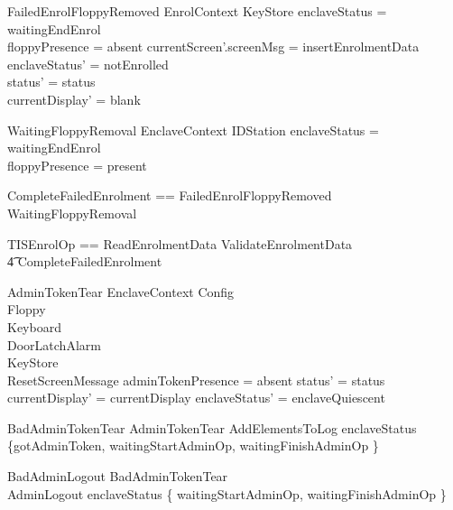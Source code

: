 \begin{schema}{FailedEnrolFloppyRemoved}
        EnrolContext
\also
        \Xi KeyStore
\where
        enclaveStatus = waitingEndEnrol
\\      floppyPresence = absent
\also
        currentScreen'.screenMsg = insertEnrolmentData
\also
        enclaveStatus' = notEnrolled
\\      status' = status
\\      currentDisplay' = blank
\end{schema}

\begin{schema}{WaitingFloppyRemoval}
        EnclaveContext
\also
        \Xi IDStation
\where
        enclaveStatus = waitingEndEnrol
\\      floppyPresence = present
\end{schema}

\begin{zed}
        CompleteFailedEnrolment == FailedEnrolFloppyRemoved  
         \lor WaitingFloppyRemoval
\end{zed}

\begin{zed}
        TISEnrolOp == ReadEnrolmentData \lor
ValidateEnrolmentData 
\\      \t4 \lor CompleteFailedEnrolment
\end{zed}

\begin{schema}{AdminTokenTear}
         EnclaveContext
\also
        \Xi Config
\\      \Xi Floppy
\\      \Xi Keyboard
\\      \Xi DoorLatchAlarm
\\      \Xi KeyStore
\\      ResetScreenMessage
\where
        adminTokenPresence = absent
\also   
        status' = status
\\      currentDisplay' = currentDisplay
\also
        enclaveStatus' = enclaveQuiescent
\end{schema}

\begin{schema}{BadAdminTokenTear} 
        AdminTokenTear
\also
        AddElementsToLog
\where
        enclaveStatus \in \{gotAdminToken, waitingStartAdminOp, waitingFinishAdminOp \}
\end{schema}

\begin{schema}{BadAdminLogout}
        BadAdminTokenTear
\\      AdminLogout
\where
        enclaveStatus \in \{ waitingStartAdminOp, waitingFinishAdminOp
        \}
\end{schema}

